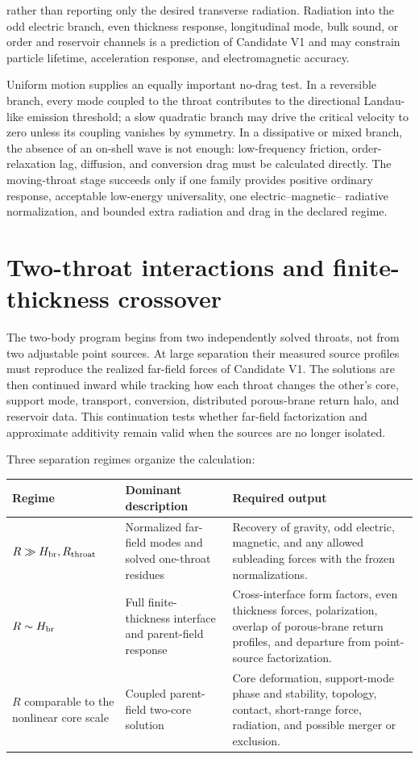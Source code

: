 rather than reporting only the desired transverse radiation. Radiation into the
odd electric branch, even thickness response, longitudinal mode, bulk sound, or
order and reservoir channels is a prediction of Candidate V1 and may constrain
particle lifetime, acceleration response, and electromagnetic accuracy.

Uniform motion supplies an equally important no-drag test. In a reversible
branch, every mode coupled to the throat contributes to the directional
Landau-like emission threshold; a slow quadratic branch may drive the critical
velocity to zero unless its coupling vanishes by symmetry. In a dissipative or
mixed branch, the absence of an on-shell wave is not enough: low-frequency
friction, order-relaxation lag, diffusion, and conversion drag must be calculated
directly. The moving-throat stage succeeds only if one family provides positive
ordinary response, acceptable low-energy universality, one electric--magnetic--
radiative normalization, and bounded extra radiation and drag in the declared
regime.

\section{Two-throat interactions and finite-thickness crossover}

The two-body program begins from two independently solved throats, not from two
adjustable point sources. At large separation their measured source profiles
must reproduce the realized far-field forces of Candidate V1. The solutions are
then continued inward while tracking how each throat changes the other's core,
support mode, transport, conversion, distributed porous-brane return halo, and
reservoir data.
This continuation tests whether far-field factorization and approximate
additivity remain valid when the sources are no longer isolated.

Three separation regimes organize the calculation:

\begin{center}
\begin{tabularx}{\textwidth}{@{}L{0.22\textwidth}L{0.31\textwidth}X@{}}
\toprule
\textbf{Regime} & \textbf{Dominant description} & \textbf{Required output} \\
\midrule
\(R\gg H_{\rm br},R_{\rm throat}\)
& Normalized far-field modes and solved one-throat residues
& Recovery of gravity, odd electric, magnetic, and any allowed subleading forces with the frozen normalizations. \\
\(R\sim H_{\rm br}\)
& Full finite-thickness interface and parent-field response
& Cross-interface form factors, even thickness forces, polarization, overlap of porous-brane return profiles, and departure from point-source factorization. \\
\(R\) comparable to the nonlinear core scale
& Coupled parent-field two-core solution
& Core deformation, support-mode phase and stability, topology, contact, short-range force, radiation, and possible merger or exclusion. \\
\bottomrule
\end{tabularx}
\end{center}

